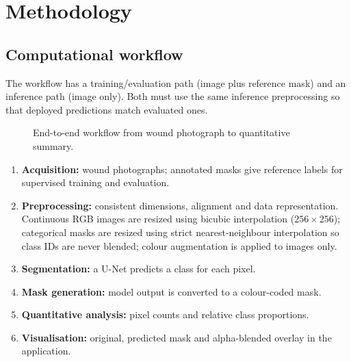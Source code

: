 \documentclass[12pt,a4paper]{article}
\begin{document}
\section{Methodology}
\subsection{Computational workflow}
The workflow has a training/evaluation path (image plus reference mask) and an inference path (image only). Both must use the same inference preprocessing so that deployed predictions match evaluated ones.

\begin{figure}[H]\centering
{}
\caption{End-to-end workflow from wound photograph to quantitative summary.}\label{fig:pipeline}
\end{figure}

\begin{enumerate}
\item \textbf{Acquisition:} wound photographs; annotated masks give reference labels for supervised training and evaluation.
\item \textbf{Preprocessing:} consistent dimensions, alignment and data representation. Continuous RGB images are resized using bicubic interpolation ($256\times256$); categorical masks are resized using strict nearest-neighbour interpolation so class IDs are never blended; colour augmentation is applied to images only.
\item \textbf{Segmentation:} a U-Net predicts a class for each pixel.
\item \textbf{Mask generation:} model output is converted to a colour-coded mask.
\item \textbf{Quantitative analysis:} pixel counts and relative class proportions.
\item \textbf{Visualisation:} original, predicted mask and alpha-blended overlay in the application.
\end{enumerate}
\end{document}

